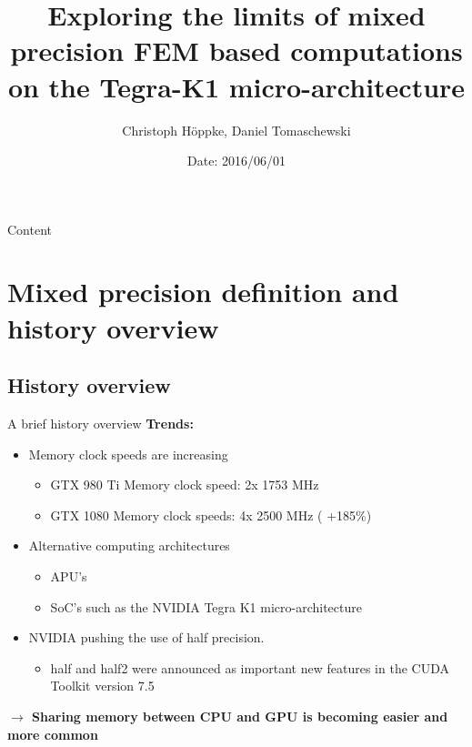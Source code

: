 \documentclass[10pt]{beamer}
\title{Exploring  the  limits  of  mixed  precision  FEM  based  computations  on  the  Tegra-K1
micro-architecture}
\author{Christoph H\"oppke, Daniel Tomaschewski}
\institute[TU Dortmund]{TU Dortmund}
\date{Date: 2016/06/01}
\begin{document}
\begin{frame}[c]
  \titlepage
\end{frame}

\logo{}

\begin{frame}{Content}
\tableofcontents

\end{frame}
\section{Mixed precision definition and history overview}

\subsection{History overview}
\begin{frame}{A brief history overview}
\textbf{Trends:}\\
\begin{itemize}
  \item Memory clock speeds are increasing\\
  \begin{itemize}
    \item GTX 980 Ti Memory clock speed: 2x 1753 MHz
    \item GTX 1080 Memory clock speeds: 4x 2500 MHz (\color{red} +185\%\color{black})
  \end{itemize}
  \item Alternative computing architectures\\
  \begin{itemize}
    \item APU's
    \item SoC's such as the NVIDIA Tegra K1 micro-architecture
  \end{itemize}
  \item NVIDIA pushing the use of half precision. 
  \begin{itemize}
   \item half and half2 were announced as important new features in the CUDA Toolkit version 7.5 \cite{nvidiahalf}
  \end{itemize}
\end{itemize}
\textbf{$\rightarrow$ Sharing memory between CPU and GPU is becoming easier and more common}
\end{frame}
\end{document}

